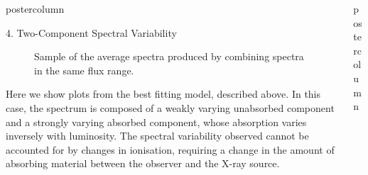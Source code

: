 \documentclass[final]{beamer}
\newlength{\columnheight}
\begin{document}
\begin{frame}
\begin{columns}
\begin{column}{.5\textwidth}
\begin{beamercolorbox}[center,wd=\textwidth]{postercolumn}
\begin{minipage}[T]{.98\textwidth}
{                    %

            \begin{block}{4. Two-Component Spectral Variability}
            
		\vspace{-10pt}		
		\begin{wrapfigure}{L}{0.66\textwidth}
			\vspace{-10pt}
			\caption{Sample of the average spectra produced by combining 
			spectra in the same flux range.}
			\vspace{-30pt}
		\end{wrapfigure} 
		
		Here we show plots from the best fitting model, described above.
		In this case, the spectrum is composed of a weakly varying unabsorbed component
		and a strongly varying absorbed component, whose absorption varies
		inversely with luminosity. The spectral variability observed cannot
		be accounted for by changes in ionisation, requiring a change in the
		amount of absorbing material between the observer and the X-ray source.
 		
		
            \end{block}

            \vfill
            
	    \vspace{-40pt}
     




		


			} %


        \end{minipage}
      \end{beamercolorbox}
    \end{column}



    \begin{column}{.5\textwidth}
      \begin{beamercolorbox}[center,wd=\textwidth]{postercolumn}
        \begin{minipage}[T]{.97\textwidth} %
          \parbox[t][\columnheight]{\textwidth}{

}
\end{minipage}
\end{beamercolorbox}
\end{column}
\end{columns}
\end{frame}
\end{document}
